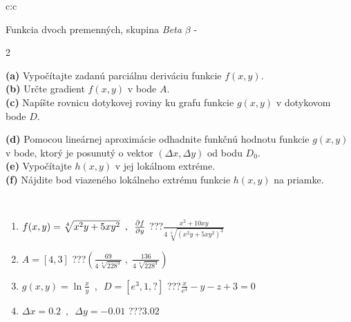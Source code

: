 \documentclass[10pt]{report}
\begin{document}
\begin{tabular}{c:c}
\begin{minipage}[c][104.5mm][t]{0.5\linewidth}
\begin{center}
\vspace{7mm}
{\huge \LARGE Funkcia dvoch premenných, skupina \textit{Beta $\beta$} -}\\[5mm]
\begin{minipage}{0.95\linewidth}
\begin{center}
{\small \begin{multicols}{2} \raggedright
\textbf{(a)} Vypočítajte zadanú parciálnu deriváciu funkcie \(f(x,y)\). \\[1mm]
\textbf{(b)} Určte gradient \(f(x,y)\) v bode \(A\). \\[1mm]
\textbf{(c)} Napíšte rovnicu dotykovej roviny ku grafu funkcie \(g(x,y)\) v dotykovom bode \(D\). \par \columnbreak
\textbf{(d)} Pomocou lineárnej aproximácie odhadnite funkčnú hodnotu funkcie \(g(x,y)\) v bode, ktorý je posunutý o vektor \((\Delta x, \Delta y)\) od bodu \(D_0\). \\[1mm]
\textbf{(e)} Vypočítajte \(h(x,y)\) v jej lokálnom extréme. \\[1mm]
\textbf{(f)} Nájdite bod viazeného lokálneho extrému funkcie \(h(x,y)\) na priamke. \\[1mm]
\end{multicols}
}
\end{center}
\end{minipage}
\\[4mm]
\begin{minipage}{0.79\linewidth}
\begin{center}
\begin{varwidth}{\linewidth}
\begin{enumerate}
\normalsizerr
\item $f(x,y) = \sqrt[4]{x^2y + 5xy^2}\enspace , \enspace \pdv{f}{y}$\quad \dotfill\; ???\;\dotfill \quad $\frac{x^2+10xy}{4\,\sqrt[4]{(x^2y+5xy^2)^{3}}}$
\item $A = [4, 3]$\quad \dotfill\; ???\;\dotfill \quad $\left( \frac{69}{4\,\sqrt[4]{228^3}} \;,\; \frac{136}{4\,\sqrt[4]{228^3}} \right)$
\item $g(x,y) = \ln\frac{x}{y} \enspace , \enspace D=[e^{3},1,?]$\quad \dotfill\; ???\;\dotfill \quad $\frac{x}{e^3} - y - z + 3 = 0$
\item $\Delta x = {0.2} \enspace,\enspace \Delta y = {-0.01}$\quad \dotfill\; ???\;\dotfill \quad $3.02$

\end{enumerate}
\end{varwidth}
\end{center}
\end{minipage}
\end{center}
\end{minipage}
\end{tabular}
\end{document}
